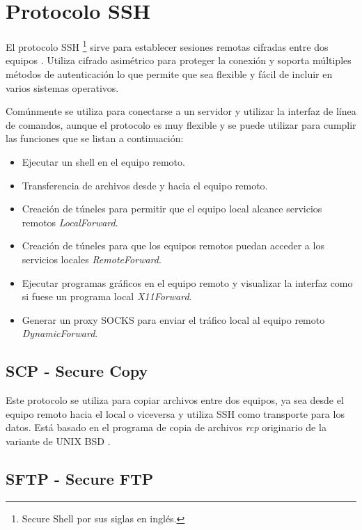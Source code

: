 \section {Protocolo SSH}

El protocolo \textsc{SSH} \footnote{Secure Shell por sus siglas en ingl\'{e}s.} sirve para establecer sesiones remotas cifradas entre dos equipos \cite{_ssh_????-1}. Utiliza cifrado asim\'{e}trico para proteger la conexi\'{o}n y soporta m\'{u}ltiples m\'{e}todos de autenticaci\'{o}n lo que permite que sea flexible y f\'{a}cil de incluir en varios sistemas operativos.

Com\'{u}nmente se utiliza para conectarse a un servidor y utilizar la interfaz de l\'{i}nea de comandos, aunque el protocolo es muy flexible y se puede utilizar para cumplir las funciones que se listan a continuaci\'{o}n:

  \begin{itemize}
    \item{Ejecutar un shell en el equipo remoto.}
    \item{Transferencia de archivos desde y hacia el equipo remoto.}
    \item{Creaci\'{o}n de t\'{u}neles para permitir que el equipo local alcance servicios remotos \textit{LocalForward}.}
    \item{Creaci\'{o}n de t\'{u}neles para que los equipos remotos puedan acceder a los servicios locales \textit{RemoteForward}.}
    \item{Ejecutar programas gr\'{a}ficos en el equipo remoto y visualizar la interfaz como si fuese un programa local \textit{X11Forward}.}
    \item{Generar un proxy \textsc{SOCKS} para enviar el tr\'{a}fico local al equipo remoto \textit{DynamicForward}.}
  \end{itemize}

  \subsection {SCP - Secure Copy}

Este protocolo se utiliza para copiar archivos entre dos equipos, ya sea desde el equipo remoto hacia el local o viceversa y utiliza \textsc{SSH} como transporte para los datos. Est\'{a} basado en el programa de copia de archivos \textit{rcp} originario de la variante de \textsc{UNIX} \textsc{BSD} \cite{_scp_????}.

  \subsection {SFTP - Secure FTP}

